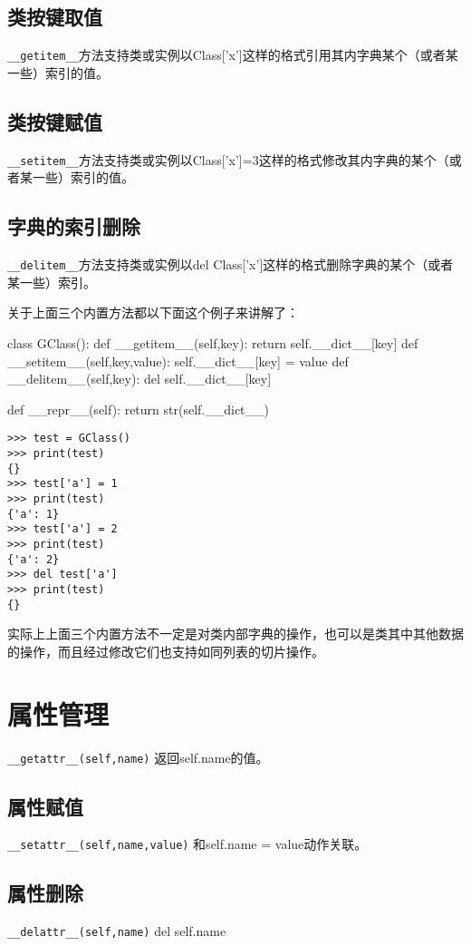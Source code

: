 \documentclass[12pt,oneside]{book}
\begin{document}
\begin{common-format}
\subsection{类按键取值}
\verb+__getitem__+方法支持类或实例以Class['x']这样的格式引用其内字典某个（或者某一些）索引的值。



\subsection{类按键赋值}
\verb+__setitem__+方法支持类或实例以Class['x']=3这样的格式修改其内字典的某个（或者某一些）索引的值。

\subsection{字典的索引删除}
\verb+__delitem__+方法支持类或实例以del Class['x']这样的格式删除字典的某个（或者某一些）索引。

关于上面三个内置方法都以下面这个例子来讲解了：
\begin{tcbpython}[]
class GClass():
    def __getitem__(self,key):
        return self.__dict__[key]
    def __setitem__(self,key,value):
        self.__dict__[key] = value
    def __delitem__(self,key):
        del self.__dict__[key]

    def __repr__(self):
        return str(self.__dict__)
\end{tcbpython}

\begin{Verbatim}
>>> test = GClass()
>>> print(test)
{}
>>> test['a'] = 1
>>> print(test)
{'a': 1}
>>> test['a'] = 2
>>> print(test)
{'a': 2}
>>> del test['a']
>>> print(test)
{}
\end{Verbatim}

实际上上面三个内置方法不一定是对类内部字典的操作，也可以是类其中其他数据的操作，而且经过修改它们也支持如同列表的切片操作。



\section{属性管理}
\verb+__getattr__(self,name)+  返回self.name的值。 

\subsection{属性赋值}
\verb+__setattr__(self,name,value)+  和self.name = value动作关联。
\subsection{属性删除}
\verb+__delattr__(self,name)+  del self.name



\end{common-format}
\end{document}
